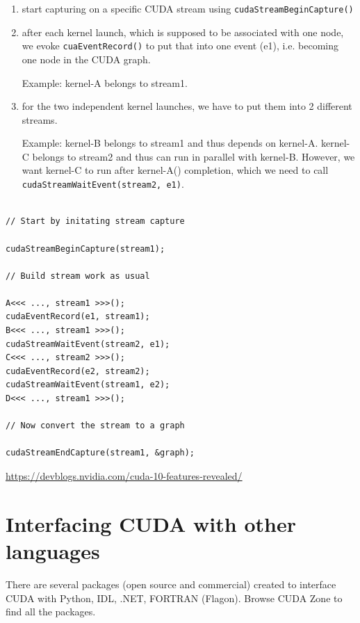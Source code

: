 \begin{enumerate}
  \item start capturing on a specific CUDA stream using \verb!cudaStreamBeginCapture()!
  
  \item after each kernel launch, which is supposed to be associated with one
  node, we evoke \verb!cuaEventRecord()! to put that into one event (e1), i.e.
  becoming one node in the CUDA graph.
  
 Example: kernel-A belongs to stream1.
  
  \item for the two independent kernel launches, we have to put them into 2 different streams.
 
 Example: kernel-B belongs to stream1 and thus depends on kernel-A. 
 kernel-C belongs to stream2 and thus can run in parallel with kernel-B. 
 However, we want kernel-C to run after kernel-A() completion, which 
 we need to call \verb!cudaStreamWaitEvent(stream2, e1)!.
  
\end{enumerate}
\begin{lstlisting}

// Start by initating stream capture

cudaStreamBeginCapture(stream1);

// Build stream work as usual

A<<< ..., stream1 >>>();
cudaEventRecord(e1, stream1);
B<<< ..., stream1 >>>();
cudaStreamWaitEvent(stream2, e1);
C<<< ..., stream2 >>>();
cudaEventRecord(e2, stream2);
cudaStreamWaitEvent(stream1, e2);
D<<< ..., stream1 >>>();

// Now convert the stream to a graph

cudaStreamEndCapture(stream1, &graph);
\end{lstlisting}

\url{https://devblogs.nvidia.com/cuda-10-features-revealed/}



\section{Interfacing CUDA with other languages}
\label{sec:interf-cuda-with}



There are several packages (open source and commercial) created to
interface CUDA with Python, IDL, .NET, FORTRAN (Flagon). Browse CUDA
Zone to find all the packages.

